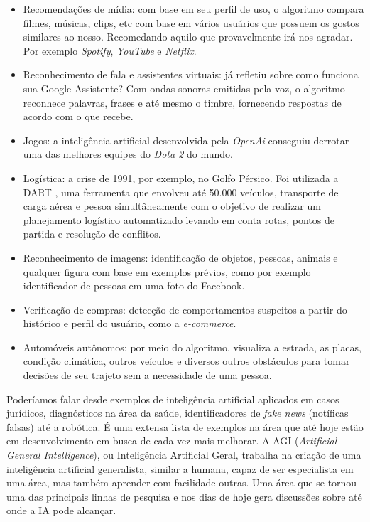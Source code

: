 \documentclass[
  openany]{book}
\begin{document}
\begin{itemize}
\item
  Recomendações de mídia: com base em seu perfil de uso, o algoritmo compara filmes, músicas, clips, etc com base em vários usuários que possuem os gostos similares ao nosso. Recomedando aquilo que provavelmente irá nos agradar. Por exemplo \emph{Spotify}, \emph{YouTube} e \emph{Netflix}.
\item
  Reconhecimento de fala e assistentes virtuais: já refletiu sobre como funciona sua Google Assistente? Com ondas sonoras emitidas pela voz, o algoritmo reconhece palavras, frases e até mesmo o timbre, fornecendo respostas de acordo com o que recebe.
\item
  Jogos: a inteligência artificial desenvolvida pela \emph{OpenAi} conseguiu derrotar uma das melhores equipes do \emph{Dota 2} do mundo.
\item
  Logística: a crise de 1991, por exemplo, no Golfo Pérsico. Foi utilizada a DART \citep{cross1994dart}, uma ferramenta que envolveu até 50.000 veículos, transporte de carga aérea e pessoa simultâneamente com o objetivo de realizar um planejamento logístico automatizado levando em conta rotas, pontos de partida e resolução de conflitos.
\item
  Reconhecimento de imagens: identificação de objetos, pessoas, animais e qualquer figura com base em exemplos prévios, como por exemplo identificador de pessoas em uma foto do Facebook.
\item
  Verificação de compras: detecção de comportamentos suspeitos a partir do histórico e perfil do usuário, como a \emph{e-commerce}.
\item
  Automóveis autônomos: por meio do algoritmo, visualiza a estrada, as placas, condição climática, outros veículos e diversos outros obstáculos para tomar decisões de seu trajeto sem a necessidade de uma pessoa.
\end{itemize}

Poderíamos falar desde exemplos de inteligência artificial aplicados em casos jurídicos, diagnósticos na área da saúde, identificadores de \emph{fake news} (notíficas falsas) até a robótica. É uma extensa lista de exemplos na área que até hoje estão em desenvolvimento em busca de cada vez mais melhorar. A AGI (\emph{Artificial General Intelligence}), ou Inteligência Artificial Geral, trabalha na criação de uma inteligência artificial generalista, similar a humana, capaz de ser especialista em uma área, mas também aprender com facilidade outras. Uma área que se tornou uma das principais linhas de pesquisa e nos dias de hoje gera discussões sobre até onde a IA pode alcançar.
\end{document}
